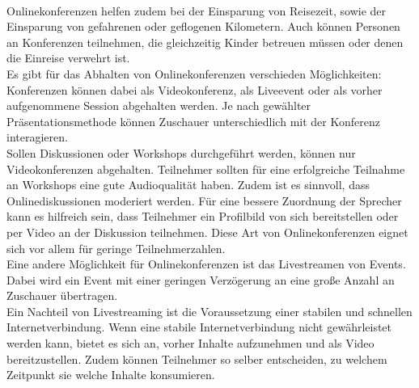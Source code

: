 \\
Onlinekonferenzen helfen zudem bei der Einsparung von Reisezeit, sowie der Einsparung von gefahrenen oder geflogenen Kilometern.
Auch können Personen an Konferenzen teilnehmen, die gleichzeitig Kinder betreuen müssen oder denen die Einreise verwehrt ist.
\autocite[Vgl.][]{M_Sladek.2020}
\\
Es gibt für das Abhalten von Onlinekonferenzen verschieden Möglichkeiten:\\
Konferenzen können dabei als Videokonferenz, als Liveevent oder als vorher aufgenommene Session abgehalten werden.
Je nach gewählter Präsentationsmethode können Zuschauer unterschiedlich mit der Konferenz interagieren.
\autocite[Vgl.][]{M_Sladek.2020}
\\
Sollen Diskussionen oder Workshops durchgeführt werden, können nur Videokonferenzen abgehalten.
Teilnehmer sollten für eine erfolgreiche Teilnahme an Workshops eine gute Audioqualität haben.
Zudem ist es sinnvoll, dass Onlinediskussionen moderiert werden.
Für eine bessere Zuordnung der Sprecher kann es hilfreich sein, dass Teilnehmer ein Profilbild von sich bereitstellen oder per Video an der Diskussion teilnehmen.
Diese Art von Onlinekonferenzen eignet sich vor allem für geringe Teilnehmerzahlen.
\autocite[Vgl.][]{M_Sladek.2020}
\\
Eine andere Möglichkeit für Onlinekonferenzen ist das Livestreamen von Events.
Dabei wird ein Event mit einer geringen Verzögerung an eine große Anzahl an Zuschauer übertragen.
\autocite[Vgl.][]{M_Sladek.2020}
\\
Ein Nachteil von Livestreaming ist die Voraussetzung einer stabilen und schnellen Internetverbindung.
\autocite[Vgl.][]{M_Maciej.2016}
Wenn eine stabile Internetverbindung nicht gewährleistet werden kann, bietet es sich an, vorher Inhalte aufzunehmen und als Video bereitzustellen.
Zudem können Teilnehmer so selber entscheiden, zu welchem Zeitpunkt sie welche Inhalte konsumieren.
